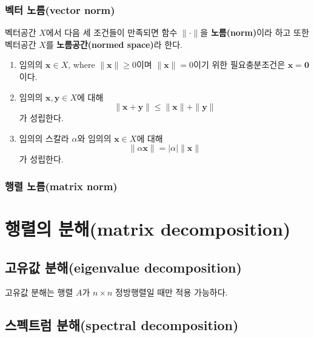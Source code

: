 \documentclass[b5paper,]{scrbook}
\theoremstyle{plain}
\theoremstyle{definition}
\numberwithin{equation}{section}
\let\BeginKnitrBlock\begin \let\EndKnitrBlock\end
\begin{document}
\hypertarget{-vector-norm}{%
\subsubsection{벡터 노름(vector norm)}\label{-vector-norm}}

\BeginKnitrBlock{definition}[노름과 노름공간]
\protect\hypertarget{def:unnamed-chunk-14}{}{\label{def:unnamed-chunk-14} {} }벡터공간 \(X\)에서 다음 세 조건들이 만족되면 함수 \(\|\cdot\|\)을 \textbf{노름(norm)}이라 하고 또한 벡터공간 \(X\)를 \textbf{노름공간(normed space)}라 한다.

\begin{enumerate}
\def\labelenumi{\arabic{enumi}.}
\item
  임의의 \(\mathbf{x}\in X\), where \(\|\mathbf{x}\| \geq 0\)이며 \(\|\mathbf{x}\|=0\)이기 위한 필요충분조건은 \(\mathbf{x}=\mathbf{0}\)이다.
\item
  임의의 \(\mathbf{x}, \mathbf{y}\in X\)에 대해
  \[\| \mathbf{x}+\mathbf{y}\|\leq \|\mathbf{x}\| + \|\mathbf{y}\|\]
  가 성립한다.
\item
  임의의 스칼라 \(\alpha\)와 임의의 \(\mathbf{x}\in X\)에 대해
  \[\| \alpha \mathbf{x}\|=|\alpha| \|\mathbf{x}\|\]
  가 성립한다.
\end{enumerate}
\EndKnitrBlock{definition}

\hypertarget{-matrix-norm}{%
\subsubsection{행렬 노름(matrix norm)}\label{-matrix-norm}}

\hypertarget{-matrix-decomposition}{%
\section{행렬의 분해(matrix decomposition)}\label{-matrix-decomposition}}

\hypertarget{-eigenvalue-decomposition}{%
\subsection{고유값 분해(eigenvalue decomposition)}\label{-eigenvalue-decomposition}}

고유값 분해는 행렬 \(A\)가 \(n\times n\) 정방행렬일 때만 적용 가능하다.

\hypertarget{spectraldecomposition}{%
\subsection{스펙트럼 분해(spectral decomposition)}\label{spectraldecomposition}}
\end{document}
